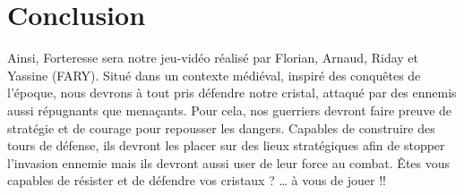 \documentclass[a4paper, 12pt]{article}
\begin{document}
\section{Conclusion}
Ainsi, Forteresse sera notre jeu-vidéo réalisé par Florian, Arnaud, Riday et Yassine (FARY). Situé dans un contexte médiéval, inspiré des conquêtes de l’époque, nous devrons à tout pris défendre notre cristal, attaqué par des ennemis aussi répugnants que menaçants. Pour cela, nos guerriers devront faire preuve de stratégie et de courage pour repousser les dangers. Capables de construire des tours de défense, ils devront les placer sur des lieux stratégiques afin de stopper l’invasion ennemie mais ils devront aussi user de leur force au combat.
Êtes vous capables de résister et de défendre vos cristaux ?
… à vous de jouer !!
\end{document}
